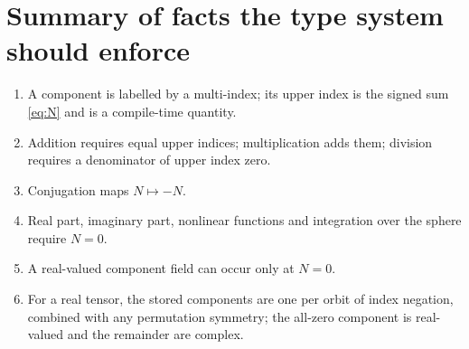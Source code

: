 \documentclass[11pt,a4paper]{article}
\begin{document}
\section{Summary of facts the type system should enforce}

\begin{enumerate}
  \item A component is labelled by a multi-index; its upper index is the
    signed sum \eqref{eq:N} and is a compile-time quantity.
  \item Addition requires equal upper indices; multiplication adds them;
    division requires a denominator of upper index zero.
  \item Conjugation maps $N \mapsto -N$.
  \item Real part, imaginary part, nonlinear functions and integration
    over the sphere require $N = 0$.
  \item A real-valued component field can occur only at $N = 0$.
  \item For a real tensor, the stored components are one per orbit of
    index negation, combined with any permutation symmetry; the
    all-zero component is real-valued and the remainder are complex.
\end{enumerate}
\end{document}
